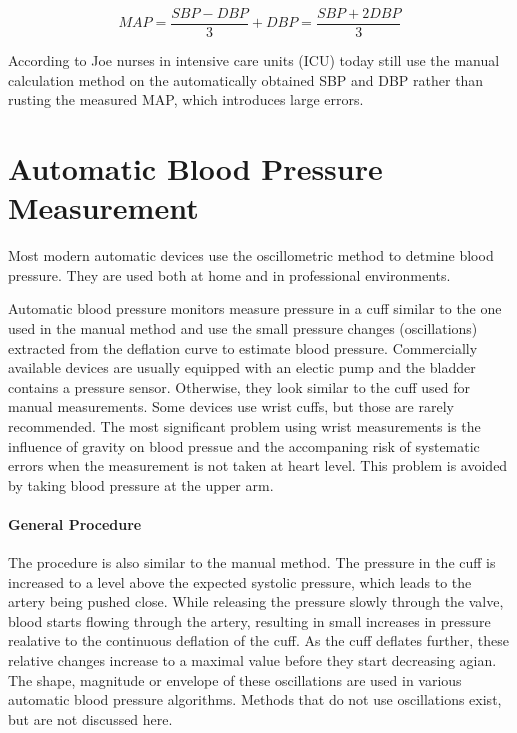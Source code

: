 \begin{equation}
MAP = \frac{SBP-DBP}{3}+DBP = \frac{SBP+2 DBP}{3}
\label{eq:MAP}
\end{equation}

According to Joe \cite{Joe2019} nurses in intensive care units (ICU) today still use the manual calculation method on the automatically obtained SBP and DBP rather than rusting the measured MAP, which introduces large errors. %

\section{Automatic Blood Pressure Measurement}

Most modern automatic devices use the oscillometric method to detmine blood pressure. They are used both at home and in professional environments. 

Automatic blood pressure monitors measure pressure in a cuff similar to the one used in the manual method and use the small pressure changes (oscillations) extracted from the deflation curve to estimate blood pressure. Commercially available devices are usually equipped with an electic pump and the bladder contains a pressure sensor. Otherwise, they look similar to the cuff used for manual measurements. Some devices use wrist cuffs, but those are rarely recommended. \cite{BIHSOC2020} The most significant problem using wrist measurements is the influence of gravity on blood pressue and the accompaning risk of systematic errors when the measurement is not taken at heart level. \cite{Boron2012} This problem is avoided by taking blood pressure at the upper arm. 

\paragraph{General Procedure} The procedure is also similar to the manual method. The pressure in the cuff is increased to a level above the expected systolic pressure, which leads to the artery being pushed close. While releasing the pressure slowly through the valve, blood starts flowing through the artery, resulting in small increases in pressure realative to the continuous deflation of the cuff. As the cuff deflates further, these relative changes increase to a maximal value before they start decreasing agian.\cite{Forouzanfar2015,Drzewiecki1994,Ursino1996} The shape, magnitude or envelope of these oscillations are used in various automatic blood pressure algorithms. Methods that do not use oscillations exist, but are not discussed here.

